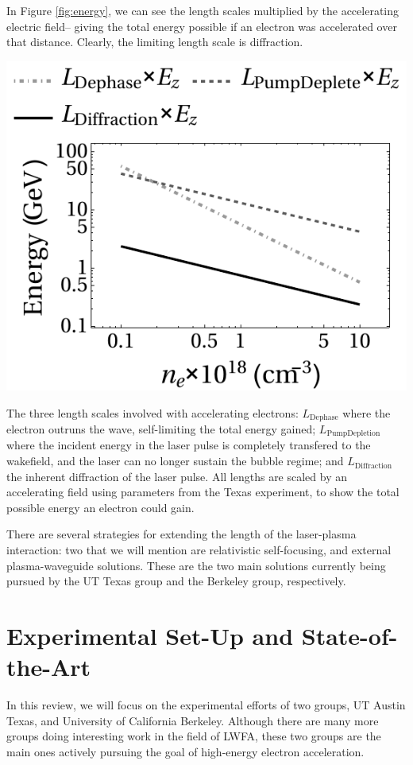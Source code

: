 \documentclass[12pt,letter]{article}
\begin{document}
    In Figure \ref{fig:energy}, we can see the length scales multiplied by the
    accelerating electric field-- giving the total energy possible if an
    electron was accelerated over that distance. Clearly, the limiting length
    scale is diffraction.
    \begin{marginfigure}
            \includegraphics[width=\linewidth]{../figures/energy.pdf}
        \caption{The three length scales involved with accelerating electrons:
        $L_\mathrm{Dephase}$ where the electron outruns the wave, self-limiting
    the total energy gained; $L_\mathrm{Pump Depletion}$ where the incident
energy in the laser pulse is completely transfered to the wakefield, and the
laser can no longer sustain the bubble regime; and $L_\mathrm{Diffraction}$ the
inherent diffraction of the laser pulse. All lengths are scaled by an
accelerating field using parameters from the Texas
experiment\cite{Wang2013}, to show the total possible energy an electron
could gain.\label{fig:energy}}
    \end{marginfigure}

    There are several strategies for extending the length of the laser-plasma
    interaction: two that we will mention are relativistic self-focusing, and
    external plasma-waveguide solutions. These are the two main solutions
    currently being pursued by the UT Texas group and the Berkeley group,
    respectively.

\section{Experimental Set-Up and State-of-the-Art}
In this review, we will focus on the experimental efforts of two groups, UT
Austin Texas, and University of California Berkeley. Although there are many
more groups doing interesting work in the field of LWFA, these two groups are
the main ones actively pursuing the goal of high-energy electron
acceleration.
\end{document}
